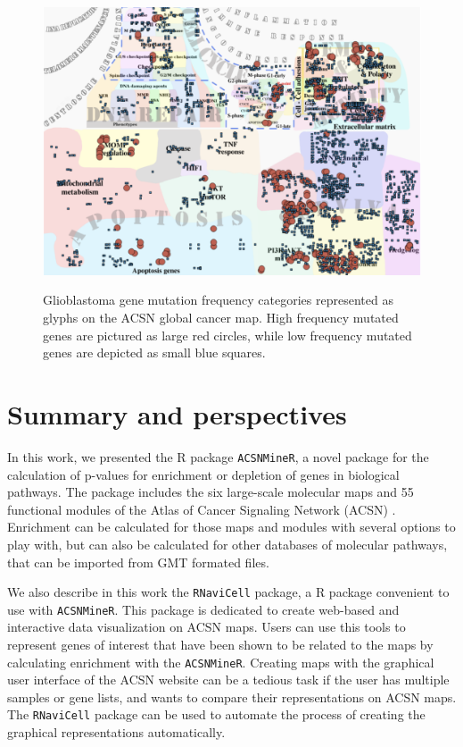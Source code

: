 \documentclass{article}
\begin{document}
\begin{figure}[!ht]
  \caption{Glioblastoma gene mutation frequency categories represented as
  glyphs on the ACSN global cancer map. High frequency mutated genes are
  pictured as large red circles, while low frequency mutated genes are depicted
  as small blue squares.
  } 
  \centering
  \includegraphics[width=\textwidth]{figures/gbm.pdf}
  \label{fig:gbm}
\end{figure}

\section[Summary and perspectives]{Summary and perspectives}
In this work, we presented the R package \verb|ACSNMineR|, a novel package for
the calculation of p-values for enrichment or depletion of genes in biological
pathways. The package includes the six large-scale molecular maps and 55
functional modules of the Atlas of Cancer Signaling Network (ACSN) . Enrichment can be
calculated for those maps and modules with several options to play with, but can
also be calculated for other databases of molecular pathways, that can be
imported from GMT formated files. 

We also describe in this work the \verb|RNaviCell| package, a R package convenient to use with \verb|ACSNMineR|. This package is dedicated to create web-based
and interactive data visualization on ACSN maps. Users can use this tools to
represent genes of interest that have been shown to be related to the maps by
calculating enrichment with the  \verb|ACSNMineR|.  Creating maps with the
graphical user interface of the ACSN website can be a tedious task if the user
has multiple samples or gene lists, and wants to compare their representations
on ACSN maps. The \verb|RNaviCell| package can be used to automate the process of
creating the graphical representations automatically. 
\end{document}
